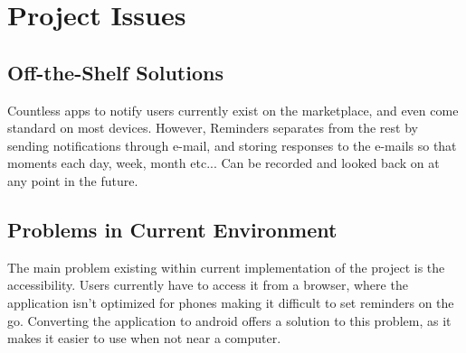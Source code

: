 \documentclass[12pt, titlepage, a4paper]{article}
\begin{document}
\section{Project Issues}

\subsection{Off-the-Shelf Solutions}
Countless apps to notify users currently exist on the marketplace, and even come standard on most devices. However, Reminders separates from the rest by sending notifications through e-mail, and storing responses to the e-mails so that moments each day, week, month etc... Can be recorded and looked back on at any point in the future.

\subsection{Problems in Current Environment}
The main problem existing within current implementation of the project is the accessibility. Users currently have to access it from a browser, where the application isn't optimized for phones making it difficult to set reminders on the go. Converting the application to android offers a solution to this problem, as it makes it easier to use when not near a computer.
\end{document}

